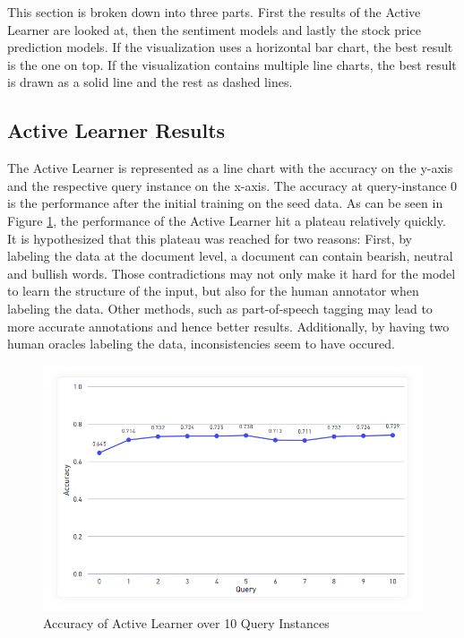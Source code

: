 \documentclass[11pt, a4paper]{article}
\begin{document}
This section is broken down into three parts. First the results of the Active Learner are looked at, then the sentiment models and
lastly the stock price prediction models. If the visualization uses a horizontal bar chart, the best result is the one on top.
If the visualization contains multiple line charts, the best result is drawn as a solid line and the rest as dashed lines.

\subsection{Active Learner Results}
The Active Learner is represented as  a line chart with the accuracy on the y-axis and the respective query instance on the x-axis.
The accuracy at query-instance 0 is the performance after the initial training on the seed data.
As can be seen in Figure \ref{fig:ActiveLearner}, the performance of the Active Learner hit a plateau relatively quickly. It is hypothesized that
this plateau was reached for two reasons: First, by labeling the data at the document level, a document can contain bearish, neutral
and bullish words. Those contradictions may not only make it hard for the model to learn the structure of the input, but also for 
the human annotator when labeling the data. Other methods, such as part-of-speech tagging may lead to more accurate annotations and hence
better results. Additionally, by having two human oracles labeling the data, inconsistencies seem to have occured.

\begin{figure}
    \centering
    \includegraphics[width=\textwidth]{ActiveLearner.png}
    \caption{Accuracy of Active Learner over 10 Query Instances}
    \label{fig:ActiveLearner}
\end{figure}
\end{document}
